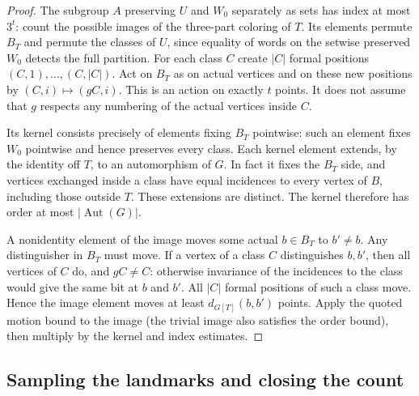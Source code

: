 \begin{proof}
The subgroup $A$ preserving $U$ and $W_0$ separately as sets has index
at most $3^t$: count the possible images of the three-part coloring of
$T$. Its elements permute $B_T$ and permute the classes of $U$, since
equality of words on the setwise preserved $W_0$ detects the full
partition. For each class $C$ create $|C|$ formal positions
$(C,1),\dots,(C,|C|)$. Act on $B_T$ as on actual vertices and on these
new positions by $(C,i)\mapsto(gC,i)$. This is an action on exactly $t$
points. It does not assume that $g$ respects any numbering of the
actual vertices inside $C$.

Its kernel consists precisely of elements fixing $B_T$ pointwise: such
an element fixes $W_0$ pointwise and hence preserves every class. Each
kernel element extends, by the identity off $T$, to an automorphism of
$G$. In fact it fixes the $B_T$ side, and vertices exchanged inside a
class have equal incidences to every vertex of $B$, including those
outside $T$. These extensions are distinct. The kernel therefore has
order at most $|\operatorname{Aut}(G)|$.

A nonidentity element of the image moves some actual $b\in B_T$ to
$b'\ne b$. Any distinguisher in $B_T$ must move. If a vertex of a class
$C$ distinguishes $b,b'$, then all vertices of $C$ do, and $gC\ne C$:
otherwise invariance of the incidences to the class would give the same
bit at $b$ and $b'$. All $|C|$ formal positions of such a class move.
Hence the image element moves at least $d_{G[T]}(b,b')$ points. Apply
the quoted motion bound to the image (the trivial image also satisfies
the order bound), then multiply by the kernel and index estimates.
\end{proof}

\subsection{Sampling the landmarks and closing the count}

